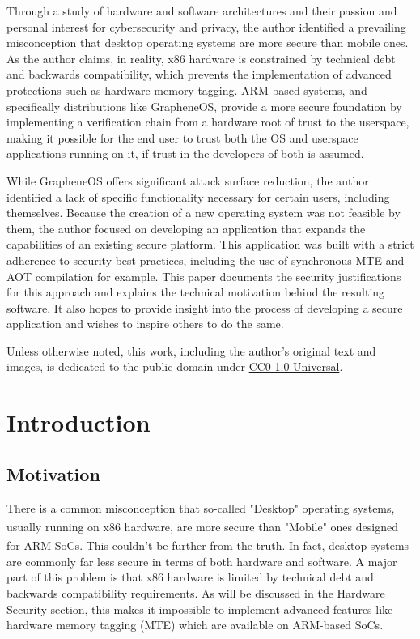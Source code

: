\documentclass[a4paper,12pt]{report}
\begin{document}
Through a study of hardware and software architectures and their passion and personal interest for cybersecurity and privacy, the author identified a prevailing misconception that desktop operating systems are more secure than mobile ones. As the author claims, in reality, x86 hardware is constrained by technical debt and backwards compatibility, which prevents the implementation of advanced protections such as hardware memory tagging. ARM-based systems, and specifically distributions like GrapheneOS, provide a more secure foundation by implementing a verification chain from a hardware root of trust to the userspace, making it possible for the end user to trust both the OS and userspace applications running on it, if trust in the developers of both is assumed.

While GrapheneOS offers significant attack surface reduction, the author identified a lack of specific functionality necessary for certain users, including themselves. Because the creation of a new operating system was not feasible by them, the author focused on developing an application that expands the capabilities of an existing secure platform. This application was built with a strict adherence to security best practices, including the use of synchronous MTE and AOT compilation for example. This paper documents the security justifications for this approach and explains the technical motivation behind the resulting software. It also hopes to provide insight into the process of developing a secure application and wishes to inspire others to do the same. 

Unless otherwise noted, this work, including the author's original text and images, is dedicated to the public domain under \href{https://creativecommons.org/publicdomain/zero/1.0/}{CC0 1.0 Universal}.

\chapter{Introduction}
\section{Motivation}
There is a common misconception that so-called "Desktop" operating systems, usually running on x86 \textsuperscript{\citep{x86}} hardware, are more secure than "Mobile" ones designed for ARM \textsuperscript{\citep{arm}} SoCs. This couldn't be further from the truth. In fact, desktop systems are commonly far less secure in terms of both hardware and software. A major part of this problem is that x86 hardware is limited by technical debt and backwards compatibility requirements. As will be discussed in the Hardware Security section, this makes it impossible to implement advanced features like hardware memory tagging (MTE) which are available on ARM-based SoCs.
\end{document}
